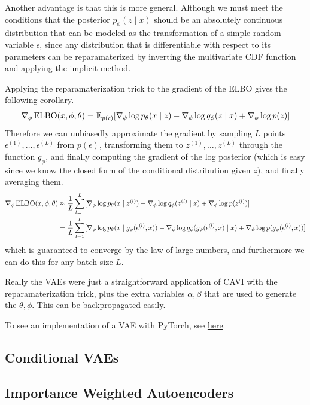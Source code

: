   Another advantage is that this is more general. Although we must meet the conditions that the posterior $p_\phi (z \mid x)$ should be an absolutely continuous distribution that can be modeled as the transformation of a simple random variable $\epsilon$, since any distribution that is differentiable with respect to its parameters can be reparamaterized by inverting the multivariate CDF function and applying the implicit method. 

  \begin{corollary}
    Applying the reparamaterization trick to the gradient of the ELBO gives the following corollary. 
    \begin{equation}
      \nabla_\phi \elbo(x, \phi, \theta) = \mathbb{E}_{p(\epsilon)}[\nabla_\phi \log p_\theta (x \mid z) - \nabla_\phi \log q_\phi (z \mid x) + \nabla_\phi \log p(z)]
    \end{equation}
    Therefore we can unbiasedly approximate the gradient by sampling $L$ points $\epsilon^{(1)}, \ldots, \epsilon^{(L)}$ from $p(\epsilon)$, transforming them to $z^{(1)}, \ldots, z^{(L)}$ through the function $g_\phi$, and finally computing the gradient of the log posterior (which is easy since we know the closed form of the conditional distribution given $z$), and finally averaging them. 
    \begin{align*}
      \nabla_\phi \elbo(x, \phi, \theta) & \approx \frac{1}{L} \sum_{l=1}^L [\nabla_\phi \log p_\theta (x \mid z^{(l)}) - \nabla_\phi \log q_\phi (z^{(l)} \mid x) + \nabla_\phi \log p(z^{(l)})] \\
                                         & = \frac{1}{L} \sum_{l=1}^L [\nabla_\phi \log p_\theta (x \mid g_\phi (\epsilon^{(l)}, x)) - \nabla_\phi \log q_\phi (g_\phi (\epsilon^{(l)}, x) \mid x) + \nabla_\phi \log p(g_\phi (\epsilon^{(l)}, x))]
    \end{align*}
    which is guaranteed to converge by the law of large numbers, and furthermore we can do this for any batch size $L$. 
  \end{corollary}


  Really the VAEs were just a straightforward application of CAVI with the reparamaterization trick, plus the extra variables $\alpha, \beta$ that are used to generate the $\theta, \phi$. This can be backpropagated easily. 

  \begin{algo}
    To see an implementation of a VAE with PyTorch, see \href{code/vae.html}{here}. 
  \end{algo}

\subsection{Conditional VAEs}

\subsection{Importance Weighted Autoencoders}

